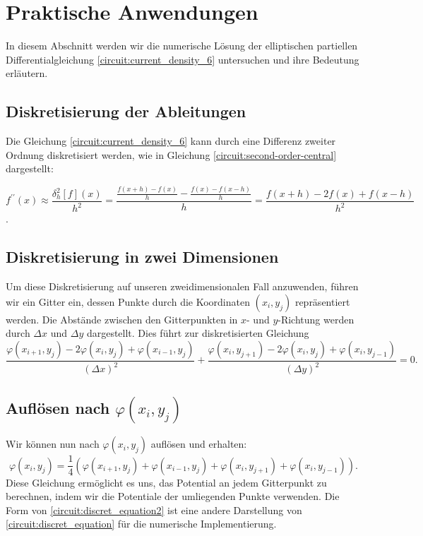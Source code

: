 \section{Praktische Anwendungen}
In diesem Abschnitt werden wir die numerische Lösung der elliptischen
partiellen Differentialgleichung \eqref{circuit:current_density_6}
untersuchen und ihre Bedeutung erläutern.

\subsection{Diskretisierung der Ableitungen} Die Gleichung \eqref{circuit:current_density_6} kann durch eine Differenz zweiter Ordnung diskretisiert werden, wie in Gleichung \eqref{circuit:second-order-central} dargestellt:

\begin{equation}
	f^{\prime \prime}(x) \approx \frac{\delta_h^2[f](x)}{h^2}=\frac{\frac{f(x+h)-f(x)}{h}-\frac{f(x)-f(x-h)}{h}}{h}=\frac{f(x+h)-2 f(x)+f(x-h)}{h^2}
	\label{circuit:second-order-central}
\end{equation}
\cite{enwiki:1220817436}.

\subsection{Diskretisierung in zwei Dimensionen}
Um diese Diskretisierung auf unseren zweidimensionalen Fall anzuwenden,
führen wir ein Gitter ein, dessen Punkte durch die Koordinaten
$(x_i, y_j)$ repräsentiert werden. Die Abstände zwischen den
Gitterpunkten in $x$- und $y$-Richtung werden durch $\Delta x$ und
$\Delta y$ dargestellt.
Dies führt zur diskretisierten Gleichung
\begin{equation}
\frac{
\varphi(x_{i+1}, y_j) - 2\varphi(x_i, y_j) + \varphi(x_{i-1}, y_j)
}{
(\Delta x)^2
}
+
\frac{
\varphi(x_i, y_{j+1}) - 2\varphi(x_i, y_j) + \varphi(x_i, y_{j-1})
}{
(\Delta y)^2
}
=
0.
\label{circuit:discret_equation}
\end{equation}

\subsection{Auflösen nach $\varphi(x_i, y_j)$} 
Wir können nun nach $\varphi(x_i, y_j)$ auflösen und erhalten:
\begin{equation}
	\varphi(x_i, y_j) = \frac{1}{4}(\varphi(x_{i+1}, y_{j}) + \varphi(x_{i-1}, y_{j}) + \varphi(x_{i}, y_{j+1}) + \varphi(x_{i}, y_{j-1})).
	\label{circuit:discret_equation2}
\end{equation}
Diese Gleichung ermöglicht es uns, das Potential an jedem Gitterpunkt zu berechnen, indem wir die Potentiale der umliegenden Punkte verwenden. Die Form von \eqref{circuit:discret_equation2} ist eine andere Darstellung von \eqref{circuit:discret_equation} für die numerische Implementierung.

